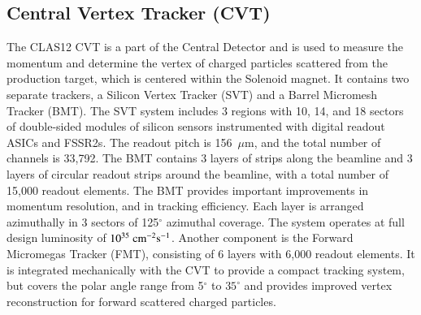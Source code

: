 \documentclass[final,3p,twocolumn]{elsarticle}
\begin{document}
\subsection{\rm Central Vertex Tracker (CVT)}
The CLAS12 CVT is a part of the Central Detector and is used to measure the momentum and determine the vertex of charged particles scattered from the production target, which is centered within the Solenoid magnet. It contains two separate trackers, a Silicon Vertex Tracker (SVT) and a Barrel Micromesh Tracker  (BMT). The SVT system includes 3 regions with 10, 14, and 18 sectors of double-sided modules of silicon sensors instrumented with digital readout ASICs and FSSR2s. The readout pitch is 156~$\mu$m, and the total number of channels is 33,792.   
The BMT contains 3 layers of strips along the beamline and 3 layers of circular readout strips around the beamline, with a total number of 15,000 readout elements. The BMT provides important improvements in momentum resolution, and in tracking efficiency. Each layer is arranged azimuthally in 3 sectors of 125$^\circ$ azimuthal coverage. The system operates at full design luminosity of $10^{35}\rm~{cm^{-2}s^{-1}}$. 
Another component is the Forward Micromegas Tracker (FMT), consisting of 6 layers with 6,000 readout elements. It  is integrated mechanically with the CVT to provide a compact tracking system, but covers the polar angle range from 5$^\circ$ to $35^\circ$ and provides improved vertex reconstruction for forward scattered charged particles.
\end{document}
